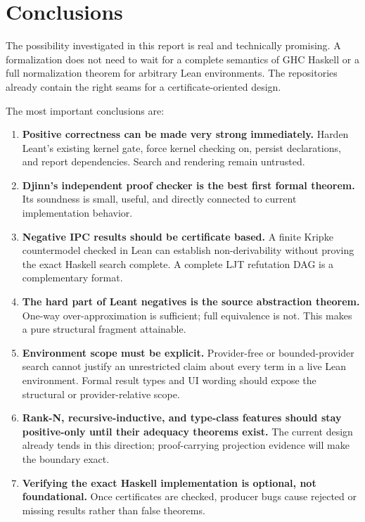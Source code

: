 \documentclass[11pt,letterpaper,openany]{report}
\theoremstyle{definition}
\theoremstyle{remark}
\begin{document}
\chapter{Conclusions}
\label{ch:conclusion}

The possibility investigated in this report is real and technically promising. A formalization does not need to wait for a complete semantics of GHC Haskell or a full normalization theorem for arbitrary Lean environments. The repositories already contain the right seams for a certificate-oriented design.

The most important conclusions are:

\begin{enumerate}
\item \textbf{Positive correctness can be made very strong immediately.} Harden Leant's existing kernel gate, force kernel checking on, persist declarations, and report dependencies. Search and rendering remain untrusted.
\item \textbf{Djinn's independent proof checker is the best first formal theorem.} Its soundness is small, useful, and directly connected to current implementation behavior.
\item \textbf{Negative IPC results should be certificate based.} A finite Kripke countermodel checked in Lean can establish non-derivability without proving the exact Haskell search complete. A complete LJT refutation DAG is a complementary format.
\item \textbf{The hard part of Leant negatives is the source abstraction theorem.} One-way over-approximation is sufficient; full equivalence is not. This makes a pure structural fragment attainable.
\item \textbf{Environment scope must be explicit.} Provider-free or bounded-provider search cannot justify an unrestricted claim about every term in a live Lean environment. Formal result types and UI wording should expose the structural or provider-relative scope.
\item \textbf{Rank-N, recursive-inductive, and type-class features should stay positive-only until their adequacy theorems exist.} The current design already tends in this direction; proof-carrying projection evidence will make the boundary exact.
\item \textbf{Verifying the exact Haskell implementation is optional, not foundational.} Once certificates are checked, producer bugs cause rejected or missing results rather than false theorems.
\end{enumerate}
\end{document}
